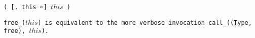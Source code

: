 
\s\tt{(} [\tt{. this =}] $this$ \tt{)}


\tt{free_(}$this$\tt{)} is equivalent to the more
verbose invocation \tt{call_((Type, free),} $this$\tt{)}.

